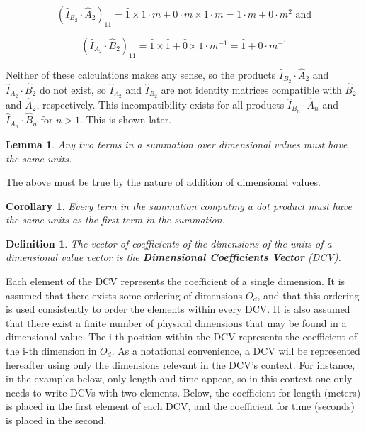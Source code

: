 \documentclass[10pt,letterpaper]{article}
\newtheorem{defn}{Definition}[section]
\newtheorem{lem}{Lemma}[section]
\newtheorem{cor}{Corollary}[section]
\numberwithin{equation}{section}
\begin{document}
\[ (\hat I_{B_2} \cdot \hat A_2)_{11} = \hat 1 \times 1 \cdot m + 0
\cdot m \times 1 \cdot m = 1 \cdot m + 0 \cdot m^2 \mbox{ and} \]

\[(\hat I_{A_2} \cdot \hat B_2)_{11} = \hat 1 \times \hat 1 + \hat 0
\times 1 \cdot m^{-1} = \hat 1 + 0 \cdot m^{-1} \]

Neither of these calculations makes any sense, so the products $\hat
I_{B_2} \cdot \hat A_2$ and $\hat I_{A_2} \cdot \hat B_2$ do not
exist, so $\hat I_{A_2}$ and $\hat I_{B_2}$ are not identity matrices
compatible with $\hat B_2$ and $\hat A_2$, respectively.  This
incompatibility exists for all products $\hat I_{B_n} \cdot \hat A_n$
and $\hat I_{A_n} \cdot \hat B_n$ for $n > 1$.  This is shown later.

\begin{lem} \label{terms_of_a_summation_have_equal_units} Any two
  terms in a summation over dimensional values must have the same
  units.\end{lem}

The above must be true by the nature of addition of dimensional values.

\begin{cor}Every term in the summation computing a dot product must
  have the same units as the first term in the summation.\end{cor}

\begin{defn}The vector of coefficients of the dimensions of the units
  of a dimensional value vector is the \textbf{Dimensional
    Coefficients Vector} (DCV).\end{defn}

Each element of the DCV represents the coefficient of a single
dimension.  It is assumed that there exists some ordering of
dimensions $O_d$, and that this ordering is used consistently to order
the elements within every DCV.  It is also assumed that there exist a
finite number of physical dimensions that may be found in a
dimensional value.  The i-th position within the DCV represents the
coefficient of the i-th dimension in $O_d$.  As a notational
convenience, a DCV will be represented hereafter using only the
dimensions relevant in the DCV's context.  For instance, in the
examples below, only length and time appear, so in this context one
only needs to write DCVs with two elements.  Below, the coefficient
for length (meters) is placed in the first element of each DCV, and
the coefficient for time (seconds) is placed in the second.
\end{document}
